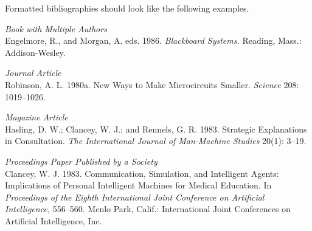 \documentclass[letterpaper]{article} %
\begin{document}




Formatted bibliographies should look like the following examples.

\smallskip \noindent \textit{Book with Multiple Authors}\\
Engelmore, R., and Morgan, A. eds. 1986. \textit{Blackboard Systems.} Reading, Mass.: Addison-Wesley.

\smallskip \noindent \textit{Journal Article}\\
Robinson, A. L. 1980a. New Ways to Make Microcircuits Smaller. \textit{Science} 208: 1019--1026.

\smallskip \noindent \textit{Magazine Article}\\
Hasling, D. W.; Clancey, W. J.; and Rennels, G. R. 1983. Strategic Explanations in Consultation. \textit{The International Journal of Man-Machine Studies} 20(1): 3--19.

\smallskip \noindent \textit{Proceedings Paper Published by a Society}\\
Clancey, W. J. 1983. Communication, Simulation, and Intelligent Agents: Implications of Personal Intelligent Machines for Medical Education. In \textit{Proceedings of the Eighth International Joint Conference on Artificial Intelligence,} 556--560. Menlo Park, Calif.: International Joint Conferences on Artificial Intelligence, Inc.
\end{document}
